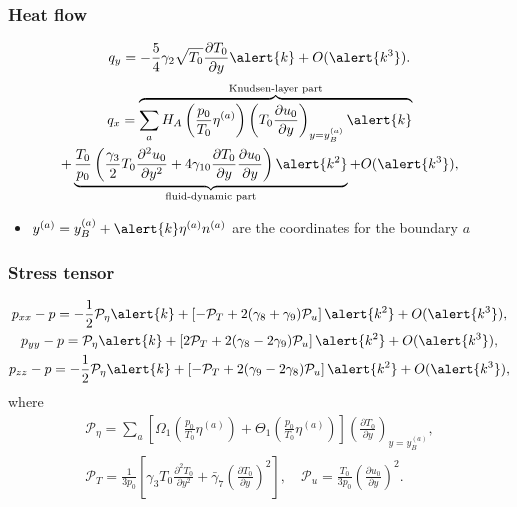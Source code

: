 \documentclass[mathserif]{beamer} %
\newcommand{\pder}[2][]{\frac{\partial#1}{\partial#2}}
\newcommand{\pderdual}[2][]{\frac{\partial^2#1}{\partial#2^2}}
\newcommand{\OO}[1]{O(#1)}
\begin{document}
\begin{frame}
    \frametitle{Heat flow}
    \begin{equation}\label{eq:Hilbert_Qy}
        q_y = -\frac54\gamma_2\sqrt{T_0}\pder[T_0]{y}\alert{k} + \OO{\alert{k^3}}.
    \end{equation}
    \pause
    \begin{multline}
        q_x = \overbrace{\sum_a H_A\left(\frac{p_0}{T_0}\eta^{(a)}\right)\left(T_0\pder[u_0]{y}\right)_{y=y_B^{(a)}}\alert{k}}
            ^\text{Knudsen-layer part} \\
            + \underbrace{\frac{T_0}{p_0}\left(\frac{\gamma_3}2 T_0 \pderdual[u_0]{y}
            + 4\gamma_{10} \pder[T_0]{y}\pder[u_0]{y}\right)\alert{k^2}}
            _\text{fluid-dynamic part} + \OO{\alert{k^3}}, \label{eq:Hilbert_Qx}
    \end{multline}

    \begin{itemize}
        \item \(y^{(a)} = y_B^{(a)} + \alert{k}\eta^{(a)} n^{(a)}\) are the coordinates for the boundary \(a\)
    \end{itemize}
\end{frame}

\begin{frame}
    \frametitle{Stress tensor}
    \begin{gather}
        p_{xx} - p = -\frac12\mathcal{P}_\eta \alert{k}
            + \left[-\mathcal{P}_T + 2(\gamma_8+\gamma_9)\mathcal{P}_u\right]\alert{k^2}
            + \OO{\alert{k^3}}, \label{eq:Hilbert_Pxx}\\
        p_{yy} - p = \mathcal{P}_\eta \alert{k}
            + \left[2\mathcal{P}_T + 2(\gamma_8-2\gamma_9)\mathcal{P}_u\right]\alert{k^2}
            + \OO{\alert{k^3}}, \label{eq:Hilbert_Pyy}\\
        p_{zz} - p = -\frac12\mathcal{P}_\eta \alert{k}
            + \left[-\mathcal{P}_T + 2(\gamma_9-2\gamma_8)\mathcal{P}_u\right]\alert{k^2}
            + \OO{\alert{k^3}}, \label{eq:Hilbert_Pzz}
    \end{gather}
    where
    \begin{gather}\label{eq:mathcal_P_def}
        \mathcal{P}_\eta = \sum_a \left[\Omega_1\left(\frac{p_0}{T_0}\eta^{(a)}\right)
            + \Theta_1\left(\frac{p_0}{T_0}\eta^{(a)}\right)\right]\left(\pder[T_0]{y}\right)_{y=y_B^{(a)}}, \\
        \mathcal{P}_T = \frac1{3p_0}\left[\gamma_3 T_0 \pderdual[T_0]{y} + \bar{\gamma}_7\left(\pder[T_0]{y}\right)^2\right], \quad
        \mathcal{P}_u = \frac{T_0}{3p_0}\left(\pder[u_0]{y}\right)^2.
    \end{gather}
\end{frame}
\end{document}

